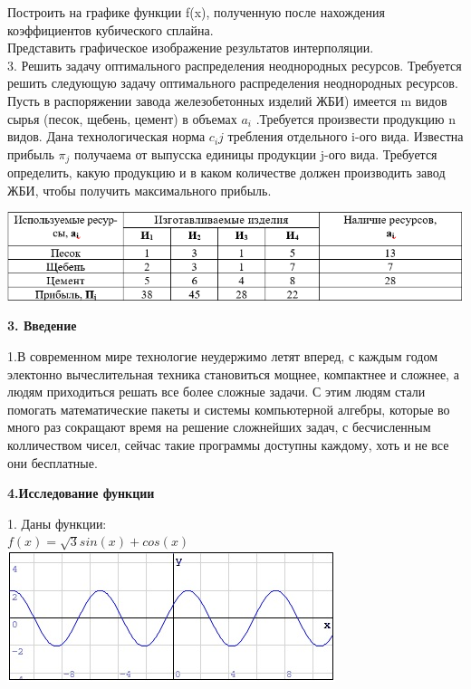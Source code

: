 \documentclass[russian,utf8,nocolumxxxi,nocolumnxxxii]{eskdtext}
\begin{document}
Построить на графике функции f(x), полученную после нахождения коэффициентов кубического сплайна.\\
Представить графическое изображение результатов интерполяции.
\\3. Решить задачу оптимального распределения неоднородных ресурсов.
Требуется решить следующую задачу оптимального распределения неоднородных ресурсов. Пусть в распоряжении завода железобетонных изделий ЖБИ) имеется m видов сырья (песок, щебень, цемент) в объемах ${a_i}$ .Требуется произвести продукцию { n} видов. Дана технологическая норма $c_ij$ требления отдельного i-ого вида. Известна прибыль $\pi_j$ получаема от выпусска единицы продукции j-ого вида. Требуется определить, какую продукцию и в каком количестве должен производить завод ЖБИ, чтобы получить максимального прибыль.
\par
\includegraphics[scale=0.5]{1}
\newpage
\begin{center} {\bf3. Введение} \end{center}
\par
\normalsize 1.В современном мире технологие неудержимо летят вперед, с каждым годом электонно вычеслительная техника становиться мощнее, компактнее и сложнее, а людям приходиться решать все более сложные задачи. С этим людям стали помогать математические пакеты и системы компьютерной алгебры, которые во много раз сокращают время на решение сложнейших задач, с бесчисленным колличеством чисел, сейчас такие программы доступны каждому, хоть и не все они бесплатные.
\newpage
\begin{center}{\bf4.Исследование функции}
\end{center}
\par\normalsize1. Даны функции:
\\$f(x)=\sqrt{3}sin(x)+cos(x)$\\ \includegraphics{f(x)}
\end{document}
